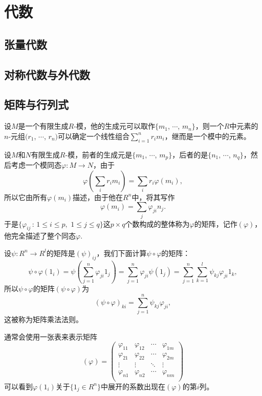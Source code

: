 \chapter{代数}
\section{张量代数}

\section{对称代数与外代数}

\section{矩阵与行列式}

\para 设$M$是一个有限生成$R$-模，他的生成元可以取作$\{m_1$, $\cdots$, $m_n\}$，则一个$R$中元素的$n$-元组$(r_1$, $\cdots$, $r_n)$可以确定一个线性组合$\sum_{i=1}^nr_im_i$，继而是一个模中的元素。

\para 设$M$和$N$有限生成$R$-模，前者的生成元是$\{m_1$, $\cdots$, $m_p\}$，后者的是$\{n_1$, $\cdots$, $n_q\}$，然后考虑一个模同态$\varphi:M\to N$，由于
\[
	\varphi\left(\sum_{i} r_im_i\right)=\sum_{i} r_i\varphi\left(m_i\right),
\]
所以它由所有$\varphi\left(m_i\right)$描述，由于他在$R^n$中，将其写作
\[
	\varphi\left(m_i\right)=\sum_{j}\varphi_{ji}n_j.
\]
于是$\{\varphi_{ij}\,:\, 1\leq i \leq p,\,\,1\leq j \leq q\}$这$p\times q$个数构成的整体称为$\varphi$的矩阵，记作$(\varphi)$，他完全描述了整个同态$\varphi$.

设$\psi:R^n\to R^l$的矩阵是$(\psi)_{ij}$，我们下面计算$\psi\circ\varphi$的矩阵：
\[
	\psi\circ\varphi(1_i)=\psi\left(\sum_{j=1}^n\varphi_{ji}1_j\right)=\sum_{j=1}^n\varphi_{ji}\psi(1_j)=\sum_{j=1}^n\sum_{k=1}^l\psi_{kj}\varphi_{ji}1_k,
\]
所以$\psi\circ\varphi$的矩阵$(\psi\circ\varphi)$为
\[
	(\psi\circ\varphi)_{ki}=\sum_{j=1}^n\psi_{kj}\varphi_{ji},
\]
这被称为矩阵乘法法则。

\para 通常会使用一张表来表示矩阵
\[
(\varphi)=
\begin{pmatrix}
	\varphi_{11} & \varphi_{12} & \cdots & \varphi_{1m}\\
	\varphi_{21} & \varphi_{22} & \cdots & \varphi_{2m}\\
	\vdots & \vdots & \ddots & \vdots \\
	\varphi_{n1} & \varphi_{n2} & \cdots & \varphi_{nm}\\
\end{pmatrix}
\]
可以看到$\varphi(1_i)$关于$\{1_j\in R^n\}$中展开的系数出现在$(\varphi)$的第$i$列。

